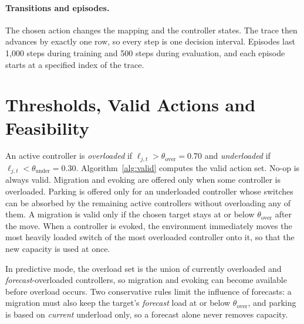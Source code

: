 \paragraph{Transitions and episodes.} The chosen action changes the mapping and the controller states. The trace then advances by exactly one row, so every step is one decision interval. Episodes last 1,000 steps during training and 500 steps during evaluation, and each episode starts at a specified index of the trace.

\section{Thresholds, Valid Actions and Feasibility}
\label{sec:valid}

An active controller is \emph{overloaded} if $\ell_{j,t}>\theta_{\text{over}}=0.70$ and \emph{underloaded} if $\ell_{j,t}<\theta_{\text{under}}=0.30$. Algorithm~\ref{alg:valid} computes the valid action set. No-op is always valid. Migration and evoking are offered only when some controller is overloaded. Parking is offered only for an underloaded controller whose switches can be absorbed by the remaining active controllers without overloading any of them. A migration is valid only if the chosen target stays at or below $\theta_{\text{over}}$ after the move. When a controller is evoked, the environment immediately moves the most heavily loaded switch of the most overloaded controller onto it, so that the new capacity is used at once.

In predictive mode, the overload set is the union of currently overloaded and \emph{forecast}-overloaded controllers, so migration and evoking can become available before overload occurs. Two conservative rules limit the influence of forecasts: a migration must also keep the target's \emph{forecast} load at or below $\theta_{\text{over}}$, and parking is based on \emph{current} underload only, so a forecast alone never removes capacity.

